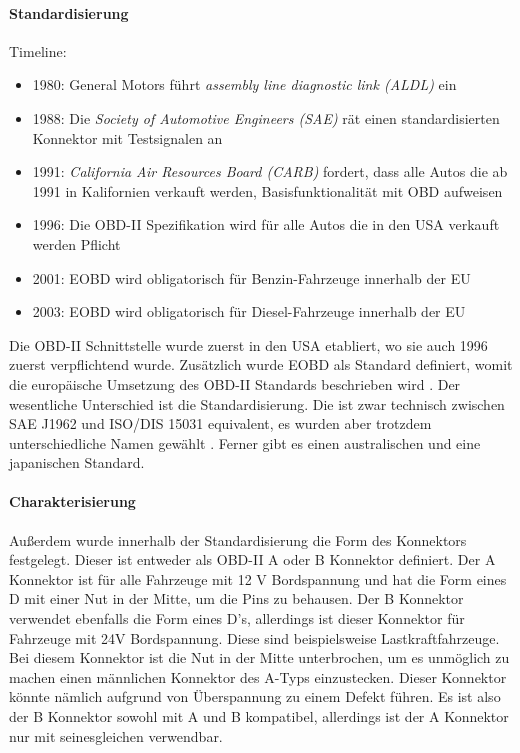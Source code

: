 \paragraph{Standardisierung}
Timeline:
\begin{itemize}
	\item 1980: General Motors führt \textit{assembly line diagnostic link (ALDL)} ein
	\item 1988: Die \textit{Society of Automotive Engineers (SAE)} rät einen standardisierten Konnektor mit Testsignalen an
	\item 1991: \textit{California Air Resources Board (CARB)} fordert, dass alle Autos die ab 1991 in Kalifornien verkauft werden, Basisfunktionalität mit OBD aufweisen
	\item 1996: Die OBD-II Spezifikation wird für alle Autos die in den USA verkauft werden Pflicht
	\item 2001: EOBD wird obligatorisch für Benzin-Fahrzeuge innerhalb der EU
	\item 2003: EOBD wird obligatorisch für Diesel-Fahrzeuge innerhalb der EU
\end{itemize}
\cite{SIMR.CH2-obd2.Timeline}
Die OBD-II Schnittstelle wurde zuerst in den USA etabliert, wo sie auch 1996 zuerst verpflichtend wurde. Zusätzlich wurde EOBD als Standard definiert, womit die europäische Umsetzung des OBD-II Standards beschrieben wird \cite{SIMR.CH2-obd2.EUP-D98/69/EC}. Der wesentliche Unterschied ist die Standardisierung. Die ist zwar technisch zwischen SAE J1962 und ISO/DIS 15031 equivalent, es wurden aber trotzdem unterschiedliche Namen gewählt \cite{SIMR.CH2-obd2.SAEJ1962}. Ferner gibt es einen australischen \cite{SIMR.CH2-obd2.AU-MVSA1989} und eine japanischen Standard.

\paragraph{Charakterisierung}
Außerdem wurde innerhalb der Standardisierung die Form des Konnektors festgelegt. Dieser ist entweder als OBD-II A oder B Konnektor definiert. Der A Konnektor ist für alle Fahrzeuge mit 12 V Bordspannung und hat die Form eines D mit einer Nut in der Mitte, um die Pins zu behausen. Der B Konnektor verwendet ebenfalls die Form eines D's, allerdings ist dieser Konnektor für Fahrzeuge mit 24V Bordspannung. Diese sind beispielsweise Lastkraftfahrzeuge. Bei diesem Konnektor ist die Nut in der Mitte unterbrochen, um es unmöglich zu machen einen männlichen Konnektor des A-Typs einzustecken. Dieser Konnektor könnte nämlich aufgrund von Überspannung zu einem Defekt führen. Es ist also der B Konnektor sowohl mit A und B kompatibel, allerdings ist der A Konnektor nur mit seinesgleichen verwendbar.

